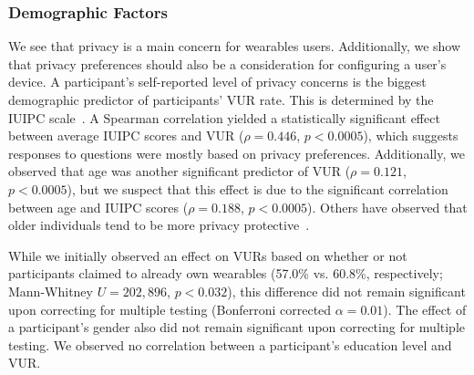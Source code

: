 \subsubsection{Demographic Factors}

We see that privacy is a main concern for wearables users. Additionally, we show that privacy preferences should also be a consideration for configuring a user's device. A participant's self-reported level of privacy concerns is the biggest demographic predictor of participants' VUR rate. This is determined by the IUIPC scale~\cite{malhotra2004internet}. A Spearman correlation yielded a statistically significant effect between average IUIPC scores and VUR ($\rho=0.446$, $p<0.0005$), which suggests responses to questions were mostly based on privacy preferences. Additionally, we observed that age was another significant predictor of VUR ($\rho=0.121$, $p<0.0005$), but we suspect that this effect is due to the significant correlation between age and IUIPC scores ($\rho=0.188$, $p<0.0005$). Others have observed that older individuals tend to be more privacy protective~\cite{varian2005demographics}.

While we initially observed an effect on VURs based on whether or not participants claimed to already own wearables (57.0\% vs. 60.8\%, respectively; Mann-Whitney $U=202,896$, $p<0.032$), this difference did not remain significant upon correcting for multiple testing (Bonferroni corrected $\alpha=0.01$). The effect of a participant's gender also did not remain significant upon correcting for multiple testing. We observed no correlation between a participant's education level and VUR.